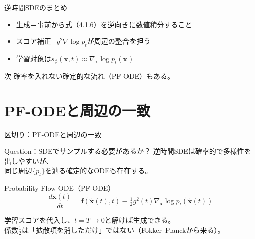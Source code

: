 \asmain
\begin{frame}{逆時間SDEのまとめ}
    \begin{itemize}
        \item 生成＝事前から式（4.1.6）を逆向きに数値積分すること
        \item スコア補正$-g^{2}\nabla\log p_t$が周辺の整合を担う
        \item 学習対象は$s_\phi(\bm{x},t)\approx\nabla_{\bm{x}}\log p_t(\bm{x})$
    \end{itemize}
    \begin{block}{次}
        確率を入れない確定的な流れ（PF-ODE）もある。
    \end{block}
\end{frame}
\section{PF-ODEと周辺の一致}
\asmain
\begin{frame}{区切り：PF-ODEと周辺の一致}
    \tableofcontents[currentsection]
\end{frame}
\asmain
\begin{frame}{Question：SDEでサンプルする必要があるか？}
    逆時間SDEは確率的で多様性を出しやすいが、\\
    同じ周辺$\{p_t\}$を辿る確定的なODEも存在する。
    \begin{block}{Probability Flow ODE（PF-ODE）}
        \[
            \frac{d\tilde{\bm{x}}(t)}{dt}
            =
            \bm{f}(\tilde{\bm{x}}(t),t)
            -
            \tfrac12 g^{2}(t)
            \nabla_{\bm{x}}\log p_t(\tilde{\bm{x}}(t))
            \tag{4.1.7}
        \]
    \end{block}
    学習スコアを代入し、$t=T\to 0$と解けば生成できる。\\
    係数$\tfrac12$は「拡散項を消しただけ」ではない（Fokker--Planckから来る）。
\end{frame}
\asmain
